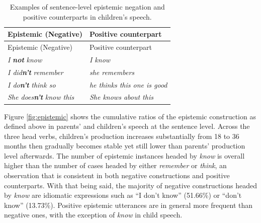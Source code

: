 \documentclass[
  english,
  man,floatsintext]{apa6}
\begin{document}
\begin{longtable}[]{@{}ll@{}}
\caption{\label{tab:epistem} Examples of sentence-level epistemic negation and positive counterparts in children's speech.}\tabularnewline
\toprule
Epistemic (Negative) & Positive counterpart \\
\midrule
\endfirsthead
\toprule
Epistemic (Negative) & Positive counterpart \\
\midrule
\endhead
\emph{I} \textbf{\emph{not}} \emph{know} & \emph{I know} \\
\emph{I did}\textbf{\emph{n't}} \emph{remember} & \emph{she remembers} \\
\emph{I do}\textbf{\emph{n't}} \emph{think so} & \emph{he thinks this one is good} \\
\emph{She does}\textbf{\emph{n't}} \emph{know this} & \emph{She knows about this} \\
\bottomrule
\end{longtable}

Figure \ref{fig:epistemic} shows the cumulative ratios of the epistemic construction as defined above in parents' and children's speech at the sentence level. Across the three head verbs, children's production increases substantially from 18 to 36 months then gradually becomes stable yet still lower than parents' production level afterwards. The number of epistemic instances headed by \emph{know} is overall higher than the number of cases headed by either \emph{remember} or \emph{think}, an observation that is consistent in both negative constructions and positive counterparts. With that being said, the majority of negative constructions headed by \emph{know} are idiomatic expressions such as ``I don't know'' (51.66\%) or ``don't know'' (13.73\%). Positive epistemic utterances are in general more frequent than negative ones, with the exception of \emph{know} in child speech.
\end{document}
